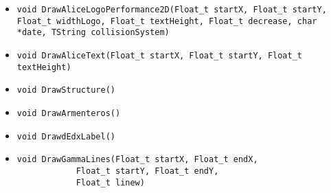 \begin{itemize}
\item 	\begin{lstlisting}
void DrawAliceLogoPerformance2D(Float_t startX, Float_t startY, Float_t widthLogo, Float_t textHeight, Float_t decrease, char *date, TString collisionSystem)
	       	\end{lstlisting}
\item 	\begin{lstlisting}
void DrawAliceText(Float_t startX, Float_t startY, Float_t textHeight)
	       	\end{lstlisting}
\item 	\begin{lstlisting}
void DrawStructure()
	       	\end{lstlisting}
\item 	\begin{lstlisting}
void DrawArmenteros()
	       	\end{lstlisting}
\item 	\begin{lstlisting}
void DrawdEdxLabel()
	       	\end{lstlisting}
\item 	\begin{lstlisting}
void DrawGammaLines(Float_t startX, Float_t endX,
		    Float_t startY, Float_t endY,
		    Float_t linew)
	       	\end{lstlisting}




	\end{itemize}


